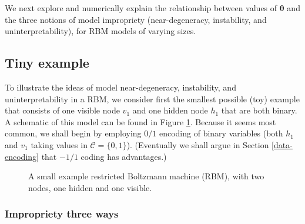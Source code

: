 \documentclass[12pt]{article}
\theoremstyle{definition}
\begin{document}
We next explore and numerically explain the relationship between values
of \(\boldsymbol \theta\) and the three notions of model impropriety
(near-degeneracy, instability, and uninterpretability), for RBM models
of varying sizes.

\subsection{Tiny example}\label{tiny-example}

To illustrate the ideas of model near-degeneracy, instability, and
uninterpretability in a RBM, we consider first the smallest possible
(toy) example that consists of one visible node \(v_1\) and one hidden
node \(h_1\) that are both binary. A schematic of this model can be
found in Figure \ref{fig:toymodel}. Because it seems most common, we
shall begin by employing \(0/1\) encoding of binary variables (both
\(h_1\) and \(v_1\) taking values in \(\mathcal{C} = \{0,1\}\)).
(Eventually we shall argue in Section \ref{data-encoding} that \(-1/1\)
coding has advantages.)
\begin{figure}[ht]
  \centering
  \resizebox{1cm}{!}{}
  \caption{A small example restricted Boltzmann machine (RBM), with two nodes, one hidden and one visible.}
  \label{fig:toymodel}
\end{figure}
\subsubsection{Impropriety three ways}\label{impropriety-three-ways}
\end{document}
